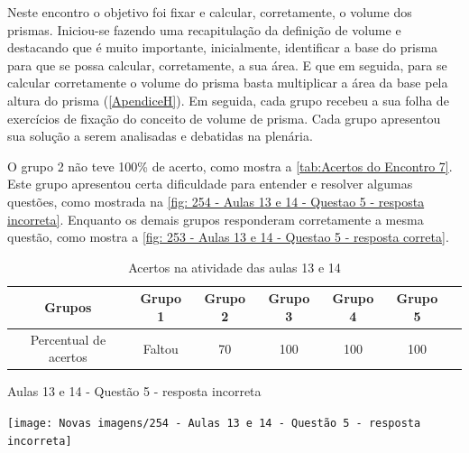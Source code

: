 Neste encontro o objetivo foi fixar e calcular, corretamente, o volume dos prismas. Iniciou-se fazendo uma recapitulação da definição de volume e destacando que é muito importante, inicialmente, identificar a base do prisma para que se possa calcular, corretamente, a sua área. E que em seguida, para se calcular corretamente o volume do prisma basta multiplicar a área da base pela altura do prisma (\autoref{ApendiceH}). Em seguida, cada grupo recebeu a sua folha de exercícios de fixação do conceito de volume de prisma. Cada grupo apresentou sua solução a serem analisadas e debatidas na plenária.


O grupo 2 não teve 100\% de acerto, como mostra a \autoref{tab:Acertos do Encontro 7}. Este grupo apresentou certa dificuldade para entender e resolver algumas questões, como mostrada na \autoref{fig: 254 - Aulas 13 e 14 - Questao 5 - resposta incorreta}. Enquanto os demais grupos responderam corretamente a mesma questão, como mostra a \autoref{fig: 253 - Aulas 13 e 14 - Questao 5 - resposta correta}.

\begin{table}[htbp] \centering
    \caption{Acertos na atividade das aulas 13 e 14} \label{tab:Acertos do Encontro 7}
    \begin{tabular}{|c|c|c|c|c|c|c|}
        \hline
        \textbf{Grupos}       & \textbf{Grupo 1} & \textbf{Grupo 2} & \textbf{Grupo 3} & \textbf{Grupo 4} & \textbf{Grupo 5} \\
        \hline
        Percentual de acertos & Faltou           & 70               & 100              & 100              & 100              \\
        \hline
    \end{tabular}
    \legend{\legendaTabela}
\end{table}

\begin{CenteredFigure}
    \caption{Aulas 13 e 14 - Questão 5 - resposta incorreta} \label{fig: 254 - Aulas 13 e 14 - Questao 5 - resposta incorreta}
    \texttt{[image: Novas imagens/254 - Aulas 13 e 14 - Questão 5 - resposta incorreta]}
    \legend{\autoria}
\end{CenteredFigure}

